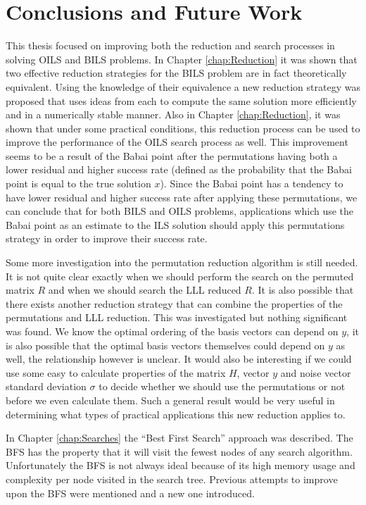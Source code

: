 \documentclass[12pt,Bold,letterpaper]{mcgilletdclass}
\begin{document}
\chapter{Conclusions and Future Work} \label{chap:Conclusion}

This thesis focused on improving both the reduction and search processes in solving OILS and BILS problems. In Chapter \ref{chap:Reduction} it was shown that two effective reduction strategies for the BILS problem are in fact theoretically equivalent. Using the knowledge of their equivalence a new reduction strategy was proposed that uses ideas from each to compute the same solution more efficiently and in a numerically stable manner. Also in Chapter \ref{chap:Reduction}, it was shown that under some practical conditions, this reduction process can be used to improve the performance of the OILS search process as well. This improvement seems to be a result of the Babai point after the permutations having both a lower residual and higher success rate (defined as the probability that the Babai point is equal to the true solution $x$). Since the Babai point has a tendency to have lower residual and higher success rate after applying these permutations, we can conclude that for both BILS and OILS problems, applications which use the Babai point as an estimate to the ILS solution should apply this permutations strategy in order to improve their success rate.

Some more investigation into the permutation reduction algorithm is still needed. It is not quite clear exactly when we should perform the search on the permuted matrix $R$ and when we should search the LLL reduced $R$. It is also possible that there exists another reduction strategy that can combine the properties of the permutations and LLL reduction. This was investigated but nothing significant was found. We know the optimal ordering of the basis vectors can depend on $y$, it is also possible that the optimal basis vectors themselves could depend on $y$ as well, the relationship however is unclear. It would also be interesting if we could use some easy to calculate properties of the matrix $H$, vector $y$ and noise vector standard deviation $\sigma$ to decide whether we should use the permutations or not before we even calculate them. Such a general result would be very useful in determining what types of practical applications this new reduction applies to.

In Chapter \ref{chap:Searches} the ``Best First Search'' approach was described. The BFS has the property that it will visit the fewest nodes of any search algorithm. Unfortunately the BFS is not always ideal because of its high memory usage and complexity per node visited in the search tree. Previous attempts to improve upon the BFS were mentioned and a new one introduced. 
\end{document}
